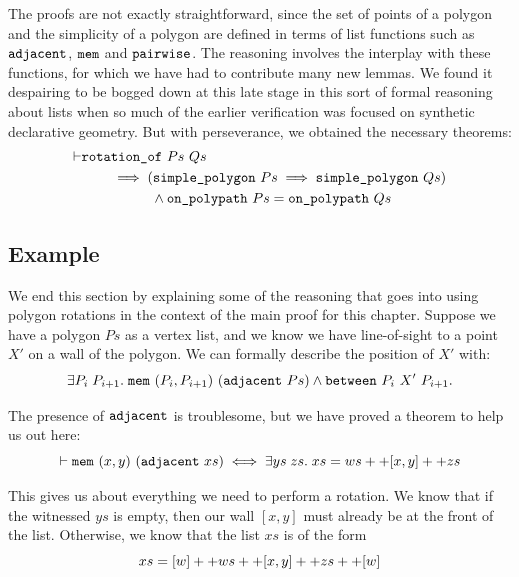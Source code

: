The proofs are not exactly straightforward, since the set of points of a polygon and the simplicity of a polygon are defined in terms of list functions such as $\texttt{adjacent}$, $\texttt{mem}$ and $\texttt{pairwise}$. The reasoning involves the interplay with these functions, for which we have had to contribute many new lemmas. We found it despairing to be bogged down at this late stage in this sort of formal reasoning about lists when so much of the earlier verification was focused on synthetic declarative geometry. But with perseverance, we obtained the necessary theorems:
\begin{equation}\label{eq:PolygonRotateInvariant}
\begin{aligned}
\vdash      &\texttt{rotation\_of}\ Ps\ Qs\\
    &\qquad\implies (\texttt{simple\_polygon}\ Ps \implies \texttt{simple\_polygon}\ Qs)\\
    &\qquad\qquad\quad\wedge \texttt{on\_polypath}\ Ps = \texttt{on\_polypath}\ Qs
  \end{aligned}
\end{equation}

\subsection{Example}
We end this section by explaining some of the reasoning that goes into using polygon rotations in the context of the main proof for this chapter. Suppose we have a polygon $Ps$ as a vertex list, and we know we have line-of-sight to a point $X'$ on a wall of the polygon. We can formally describe the position of $X'$ with:
\begin{displaymath}
  \exists P_i\; P_{i+1}.\; \texttt{mem}\ (P_i,P_{i+1})\ (\texttt{adjacent}\ Ps) \wedge \texttt{between}\ P_i\ X'\ P_{i+1}.
\end{displaymath}

The presence of $\texttt{adjacent}$ is troublesome, but we have proved a theorem to help us out here:
\begin{equation*}
\vdash  \texttt{mem}\ (x,y)\ (\texttt{adjacent}\ xs) \iff 
\exists ys\; zs.\; xs = ws ++ [x,y] ++ zs
\end{equation*}

This gives us about everything we need to perform a rotation. We know that if the witnessed $ys$ is empty, then our wall $[x,y]$ must already be at the front of the list. Otherwise, we know that the list $xs$ is of the form
\begin{displaymath}
  xs = [w] ++ ws ++ [x,y] ++ zs ++ [w]
\end{displaymath}

